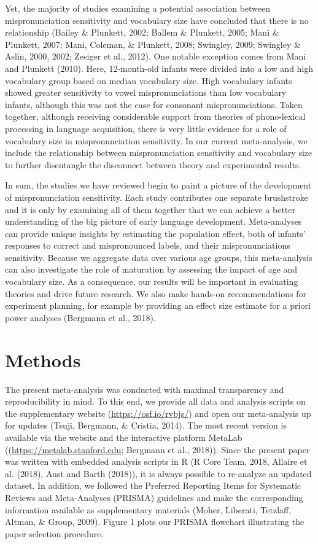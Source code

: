 \documentclass[man]{apa6}
\theoremstyle{definition}
\theoremstyle{definition}
\theoremstyle{definition}
\theoremstyle{remark}
\begin{document}
Yet, the majority of studies examining a potential association between
mispronunciation sensitivity and vocabulary size have concluded that
there is no relationship (Bailey \& Plunkett, 2002; Ballem \& Plunkett,
2005; Mani \& Plunkett, 2007; Mani, Coleman, \& Plunkett, 2008;
Swingley, 2009; Swingley \& Aslin, 2000, 2002; Zesiger et al., 2012).
One notable exception comes from Mani and Plunkett (2010). Here,
12-month-old infants were divided into a low and high vocabulary group
based on median vocabulary size. High vocabulary infants showed greater
sensitivity to vowel mispronunciations than low vocabulary infants,
although this was not the case for consonant mispronunciations. Taken
together, although receiving considerable support from theories of
phono-lexical processing in language acquisition, there is very little
evidence for a role of vocabulary size in mispronunciation sensitivity.
In our current meta-analysis, we include the relationship between
mispronunciation sensitivity and vocabulary size to further disentangle
the disconnect between theory and experimental results.

In sum, the studies we have reviewed begin to paint a picture of the
development of mispronunciation sensitivity. Each study contributes one
separate brushstroke and it is only by examining all of them together
that we can achieve a better understanding of the big picture of early
language development. Meta-analyses can provide unique insights by
estimating the population effect, both of infants' responses to correct
and mispronounced labels, and their mispronunciations sensitivity.
Because we aggregate data over various age groups, this meta-analysis
can also investigate the role of maturation by assessing the impact of
age and vocabulary size. As a consequence, our results will be important
in evaluating theories and drive future research. We also make hands-on
recommendations for experiment planning, for example by providing an
effect size estimate for a priori power analyses (Bergmann et al.,
2018).

\section{Methods}\label{methods}

The present meta-analysis was conducted with maximal transparency and
reproducibility in mind. To this end, we provide all data and analysis
scripts on the supplementary website (\url{https://osf.io/rvbjs/}) and
open our meta-analysis up for updates (Tsuji, Bergmann, \& Cristia,
2014). The most recent version is available via the website and the
interactive platform MetaLab ((\url{https://metalab.stanford.edu};
Bergmann et al., 2018)). Since the present paper was written with
embedded analysis scripts in R (R Core Team, 2018, Allaire et al.
(2018), Aust and Barth (2018)), it is always possible to re-analyze an
updated dataset. In addition, we followed the Preferred Reporting Items
for Systematic Reviews and Meta-Analyses (PRISMA) guidelines and make
the corresponding information available as supplementary materials
(Moher, Liberati, Tetzlaff, Altman, \& Group, 2009). Figure 1 plots our
PRISMA flowchart illustrating the paper selection procedure.
\end{document}
